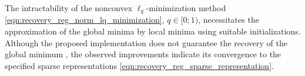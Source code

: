 The intractability of
the nonconvex $\ell_{q}$-minimization method
\eqref{eqn:recovery_reg_norm_lq_minimization}, $q \in [ 0; 1 )$, necessitates
the approximation of
the global minima by
local minima using
suitable initializations.
Although
the proposed implementation does not guarantee
the recovery of
the global minimum
\cite[Sect. 4]{article:FoucartACHA2009},
the observed improvements indicate
its convergence to
the specified sparse representations
\eqref{eqn:recovery_reg_sparse_representation}.

